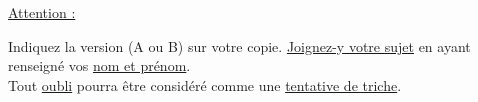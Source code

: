 \documentclass{exam}
\theoremstyle{definition}
\newtheorem{exercice}{Exercice}
\begin{document}
    
    
    
    
    \begin{tcolorbox}
        \Large
        \begin{center}
            \underline{Attention :}
        \end{center}
        \vspace{-0.5em}
        Indiquez la version (A ou B) sur votre copie. \underline{Joignez-y votre sujet} en ayant renseigné vos \underline{nom et prénom}.\\
        Tout \underline{oubli} pourra être considéré comme une \underline{tentative de triche}.
    \end{tcolorbox}
    
\end{document}
